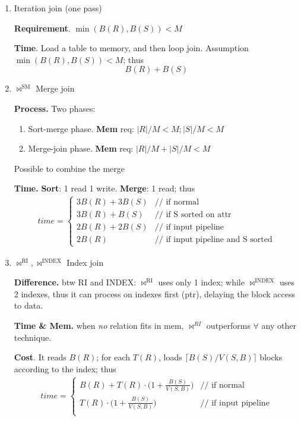 \documentclass[a4paper]{report}
\begin{document}
\begin{enumerate}
\item Iteration join (one pass)

\textbf{Requirement}. $\min(B(R), B(S)) < M$

\textbf{Time}. Load a table to memory, and then loop join. Assumption $\min(B(R), B(S))<M$; thus
$$B(R)+B(S)$$
\item $\bowtie^\text{SM}$ Merge join 

\textbf{Process.} Two phases:
\begin{enumerate}
\item Sort-merge phase. \textbf{Mem} req: $|R|/M<M; |S|/M<M$
\item Merge-join phase. \textbf{Mem} req: $|R|/M+|S|/M <M$
\end{enumerate}
Possible to combine the merge 

\textbf{Time.} \textbf{Sort}: 1 read 1 write. \textbf{Merge}: 1 read; thus 
\begin{eqnarray*}
time = \left\{ \begin{array}{rl}
  3B(R)+3B(S) &\text{// if normal} \\
  3B(R)+B(S) &\text{// if S sorted on attr} \\
  2B(R)+2B(S) &\text{// if input pipeline}\\
  2B(R) &\text{// if input pipeline and S sorted}
       \end{array} \right.
\end{eqnarray*}
\item $\bowtie^\text{RI}, \bowtie^\text{INDEX}$ Index join 

\textbf{Difference.} btw RI and INDEX: $\bowtie^\text{RI}$ uses only 1 index; while $\bowtie^\text{INDEX}$ uses 2 indexes, thus it can process on indexes first (ptr), delaying the block access to data. 

\textbf{Time \& Mem.} when \textit{no} relation fits in mem, $\bowtie^{RI}$ outperforms $\forall$ any other technique. 

\textbf{Cost}. It reads $B(R)$; for each $T(R)$, loads $\lceil B(S)/V(S, B)\rceil$ blocks according to the index; thus 
\begin{eqnarray*}
time = \left\{ \begin{array}{rl}
  B(R)+T(R)\cdot \big(1+\frac{B(S)}{V(S, B)}\big) &\text{// if normal} \\
  T(R)\cdot \big(1+\frac{B(S)}{V(S, B)}\big) &\text{// if input pipeline}\\
       \end{array} \right.
\end{eqnarray*}


\end{enumerate}
\end{document}
